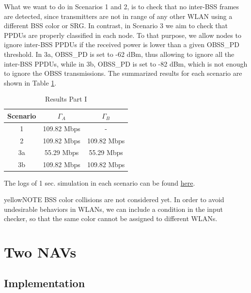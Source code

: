 \documentclass[]{article}
\begin{document}
	What we want to do in Scenarios 1 and 2, is to check that no inter-BSS frames are detected, since transmitters are not in range of any other WLAN using a different BSS color or SRG. In contrast, in Scenario 3 we aim to check that PPDUs are properly classified in each node. To that purpose, we allow nodes to ignore inter-BSS PPDUs if the received power is lower than a given OBSS\_PD threshold. In 3a, OBSS\_PD is set to -62 dBm, thus allowing to ignore all the inter-BSS PPDUs, while in 3b, OBSS\_PD is set to -82 dBm, which is not enough to ignore the OBSS transmissions. The summarized results for each scenario are shown in Table \ref{tbl:results_part_1}.
	
	\begin{table}[]
		\centering
		\begin{tabular}{|c|c|c|}
			\hline
			\textbf{Scenario} & \textbf{$\Gamma_A$} & \textbf{$\Gamma_B$} \\ \hline
			1 & 109.82 Mbps & - \\ \hline
			2 & 109.82 Mbps & 109.82 Mbps \\ \hline
			3a & 55.29 Mbps & 55.29 Mbps \\ \hline
			3b & 109.82 Mbps & 109.82 Mbps \\ \hline
		\end{tabular}
		\caption{Results Part I}
		\label{tbl:results_part_1}
	\end{table}
	
	The logs of 1 sec. simulation in each scenario can be found \href{https://bitbucket.org/fwilhelmi/towards_centralized_spatial_reuse/src/master/IEEE\%20802.11ax\%20SR\%20implementation/Validations/1.\%20BSS\%20Color\%20\%26\%20SRG/}{here}.
	
	\begin{mybox}{yellow}{NOTE}
		BSS color collisions are not considered yet. In order to avoid undesirable behaviors in WLANs, we can include a condition in the input checker, so that the same color cannot be assigned to different WLANs.	
	\end{mybox}

	
	\section{Two NAVs} 
	\label{section:two_navs}
	
	\subsection{Implementation}
	
\end{document}
